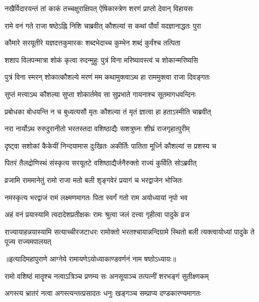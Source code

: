 \twolineshloka
{नखैर्विदारयन्तं तां काकं तच्चक्षुराक्षिपत्}
{ऐषिकास्त्रेण शरणं प्राप्तो देवान् विहायसः} %

\twolineshloka
{रामे वनं गते राजा षष्ठेऽह्नि निशि चाब्रवीत्}
{कौशल्यां स कथां पौर्वां यदज्ञानाद्धतः पुरा} %

\twolineshloka
{कौमारे सरयूतीरे यज्ञदत्तकुमारकः}
{शब्दभेदाच्च कुम्भेन शब्दं कुर्वंश्च तत्पिता} %

\twolineshloka
{शशाप विलपन्मात्रा शोकं कृत्वा रुदन्मुहुः}
{पुत्रं विना मरिष्यावस्त्वं च शोकान्मरिष्यसि} %

\twolineshloka
{पुत्रं विना स्मरन् शोकात्कौशल्ये मरणं मम}
{कथामुक्त्वाऽथ हा राममुक्त्वा राजा दिवङ्गतः} %

\twolineshloka
{सुप्तं मत्त्वाऽथ कौशल्या सुप्ता शोकार्तमेव सा}
{सुप्रभाते गायनाश्च सूतमागधवन्दिनः} %

\twolineshloka
{प्रबोधका बोधयन्ति न च बुध्यत्यसौ मृतः}
{कौशल्या तं मृतं ज्ञात्वा हा हताऽस्मीति चाब्रवीत्} %

\twolineshloka
{नरा नार्योऽथ रुरुदुरानीतो भरतस्तदा}
{वशिष्ठाद्यैः सशत्रुघ्नः शीघ्रं राजगृहात्पुरीम्} %

\twolineshloka
{दृष्ट्वा सशोकां कैकेयीं निन्दयामास दुःखितः}
{अकीर्तिः पातिता मूर्ध्नि कौशल्यां स प्रशस्य च} %

\twolineshloka
{पितरं तैलद्रोणिस्थं संस्कृत्य सरयूतटे}
{वशिष्ठाद्यैर्जनैरुक्तो राज्यं कुर्विति सोऽब्रवीत्} %

\twolineshloka
{व्रजामि राममानेतुं रामो राजा मतो बली}
{शृङ्गवेरं प्रयागं च भरद्वाजेन भोजितः} %

\twolineshloka
{नमस्कृत्य भरद्वाजं रामं लक्ष्मणमागतः}
{पिता स्वर्गं गतो राम अयोध्यायां नृपो भव} %

\twolineshloka
{अहं वनं प्रयास्यामि त्वदादेशप्रतीक्षकः}
{रामः श्रुत्वा जलं दत्त्वा गृहीत्वा पादुके व्रज} %

\threelineshloka
{राज्यायाहन्नयास्यामि सत्याच्चीरजटाधरः}
{रामोक्तो भरतश्चायान्नन्दिग्रामे स्थितो बली}
{त्यक्त्वायोध्यां पादुके ते पूज्य राज्यमपालयत्} %

॥इत्यादिमहापुराणे आग्नेये रामायणेऽयोध्याकाण्डवर्णनं नाम षष्ठोऽध्यायः॥



\twolineshloka
{रामो वशिष्ठं मातॄश्च नत्वाऽत्रिञ्च प्रणम्य सः}
{अनसूयाञ्च तत्पत्नीं शरभङ्गं सुतीक्ष्णकम्}%

\twolineshloka
{अगस्त्य भ्रातरं नत्वा अगस्त्यन्तत्प्रसादतः}
{धनुः खङ्गञ्च सम्प्राप्य दण्डकारण्यमागतः}%

